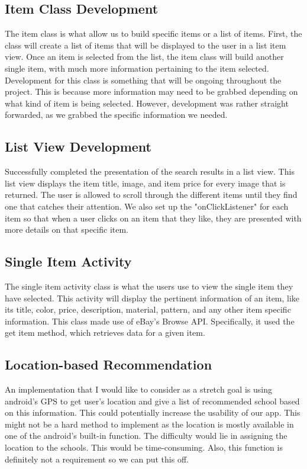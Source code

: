 \documentclass[journal,compsoc, 10pt, draftclsnofoot, onecolumn]{IEEEtran}
\begin{document}
\subsection{Item Class Development}
The item class is what allow us to build specific items or a list of items. 
First, the class will create a list of items that will be displayed to the 
user in a list item view. Once an item is selected from the list, the item 
class will build another single item, with much more information pertaining to 
the item selected. Development for this class is something that will be ongoing 
throughout the project. This is because more information may need to be grabbed 
depending on what kind of item is being selected. However, development was rather 
straight forwarded, as we grabbed the specific information we needed. 

\subsection{List View Development}
Successfully completed the presentation of the search results in a list view. 
This list view displays the item title, image, and item price for every image 
that is returned. The user is allowed to scroll through the different items 
until they find one that catches their attention. We also set up the 
"onClickListener" for each item so that when a user clicks on an item that they 
like, they are presented with more details on that specific item.


\subsection{Single Item Activity}
The single item activity class is what the users use to view the single item they 
have selected. This activity will display the pertinent information of an item, 
like its title, color, price, description, material, pattern, and any other item 
specific information. This class made use of eBay's Browse API. Specifically, it 
used the get item method, which retrieves data for a given item. 

\subsection{Location-based Recommendation}
An implementation that I would like to consider as a stretch goal is using android’s GPS to get user’s location and give a list of recommended school based on this information. This could potentially increase the usability of our app. This might not be a hard method to implement as the location is mostly available in one of the android’s built-in function. The difficulty would lie in assigning the location to the schools. This would be time-consuming. Also, this function is definitely not a requirement so we can put this off.
\end{document}
